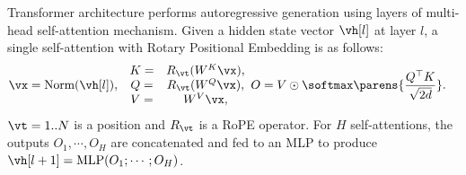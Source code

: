 
Transformer \citep{vaswani2017attention} architecture performs autoregressive generation
using layers of multi-head self-attention mechanism.
Given a hidden state vector $\vh[l]$ at layer $l$,
a single self-attention with Rotary Positional Embedding \cite[RoPE]{su2024rope} is as follows:
\begin{align}
 \vx &= \text{Norm}(\vh[l]),\
 \begin{array}{cc}
 K =& R_\vt(W^K \vx),\\
 Q =& R_\vt(W^Q \vx),\\
 V =& W^V \vx,
 \end{array}
 O = V\odot\softmax\parens{\frac{Q^\top K}{\sqrt{2d}}}.
\end{align}
$\vt=1..N$ is a position and
$R_\vt$ is a RoPE operator.
For $H$ self-attentions,
the outputs $O_1, \cdots, O_H$ are concatenated and fed to an MLP
to produce $\vh[l+1] = \text{MLP}(O_1; \cdots; O_H)$.
